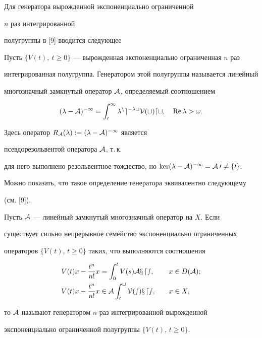  


Для генератора вырожденной экспоненциально ограниченной 


$n$ раз интегрированной


полугруппы в [9] вводится следующее





 


\begin{defn} 


Пусть $\{V(t),\ t\ge0\}$ --- вырожденная экспоненциально ограниченная $n$ раз 


интегрированная полугруппа. Генератором этой полугруппы называется линейный 


многозначный замкнутый оператор $\cal A$, определяемый соотношением 


\begin{equation} 


(\lambda-\cal A)^{-1}=\int^\infty_0 \lambda^n e^{-\lambda t} 


V(t)dt,\quad \re\lambda>\omega. 


\end{equation} 


Здесь оператор $R_{\cal A}(\lambda):=(\lambda-\cal A)^{-1}$ является 


псевдорезольвентой оператора $\cal A$, т.\,к. 


для него выполнено резольвентное тождество, но $\ker(\lambda-\cal 


A)^{-1}=\cal A0\ne\{0\}$. 


\end{defn} 





Можно показать, что такое определение генератора эквивалентно следующему


(см. [9]).


 


\begin{defn} 


Пусть $\cal A$ --- линейный замкнутый многозначный оператор на $X$. Если 


существует сильно непрерывное семейство экспоненциально ограниченных 


операторов $\{V(t)$, $t\ge0\}$ таких, что выполняются соотношения 


\begin{alignat}{2} 


V(t)x-\frac{t^n}{n!}x&=\int^t_0 V(s)\cal A x\,ds, 


&\quad x&\in D(\cal A);\\ 


% 


V(t)x-\frac{t^n}{n!}x&\in\cal A\int^t_0 V(s)x\,ds,&\quad x&\in X, 


\end{alignat} 


то $\cal A$ называют генератором $n$ раз интегрированной вырожденной 


экспоненциально ограниченной полугруппы $\{V(t)$, $t\ge0\}$. 


\end{defn} 


